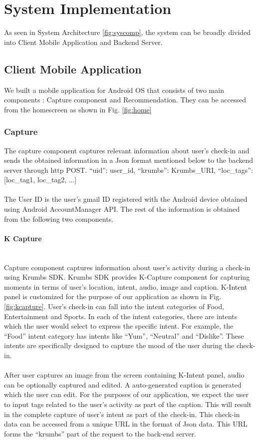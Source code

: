 \documentclass[12pt,letterpaper]{article}
\begin{document}
\section{System Implementation}
As seen in System Architecture \ref{fig:syscomp}, the system can be broadly divided into Client Mobile Application and Backend Server.

\subsection{Client Mobile Application}
We built a mobile application for Android OS \cite{android} that consists of two main components : Capture component and Recommendation. They can be accessed from the homescreen as shown in Fig. \ref{fig:home}

\subsubsection{Capture}
The capture component captures relevant information about user’s check-in and sends the obtained information in a Json format mentioned below to the backend server through http POST.
{ \enquote{uid}: user\_id, \enquote{krumbs}: Krumbs\_URI, \enquote{loc\_tags}: [loc\_tag1, loc\_tag2, ...] }
\\\\
The User ID is the user’s gmail ID registered with the Android device obtained using Android AccountManager API. The rest of the information is obtained from the following two components.

\paragraph{K Capture}\mbox{}\\
Capture component captures information about user’s activity during a check-in using Krumbs SDK. Krumbs SDK provides K-Capture component for capturing moments in terms of user’s location, intent, audio, image and caption.  K-Intent panel is customized for the purpose of our application as shown in Fig. \ref{fig:kcapture}. User’s check-in can fall into the intent categories of Food, Entertainment and Sports. In each of the intent categories, there are intents which the user would select to express the specific intent. For example, the \enquote{Food} intent category has intents like \enquote{Yum}, \enquote{Neutral} and \enquote{Dislike}. These intents are specifically designed to capture the mood of the user during the check-in.
\\\\
After user captures an image from the screen containing K-Intent panel, audio can be optionally captured and edited. A auto-generated caption is generated which the user can edit. For the purposes of our application, we expect the user to input tags related to the user’s activity as part of the caption. This will result in the complete capture of user’s intent as part of the check-in.  This check-in data can be accessed from a unique URL in the format of Json data. This URL forms the \enquote{krumbs} part of the request to the back-end server.
\end{document}

